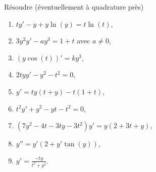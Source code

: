 

\begin{exercice}\label{exo_II-1-17}

Résoudre (éventuellement à quadrature près)
\begin{enumerate}
\item $ty'-y+y\ln(y)=t\ln(t)$,
\item $3y^2y'-ay^3=1+t$ avec $a\neq 0$,
\item $(y\cos(t))'=ky^3$,
\item $2tyy'-y^2-t^2=0$,
\item $y'=ty(t+y)-t(1+t)$,
\item $t^2y'+y^2-yt-t^2=0$,
\item $(7y^2-4t-3ty-3t^2)y'=y(2+3t+y)$,
\item $y''=y'(2+y'\tan(y))$,
\item $y'=\frac{ -ty }{ t^2+y^2 }$.
\end{enumerate}

\end{exercice}
